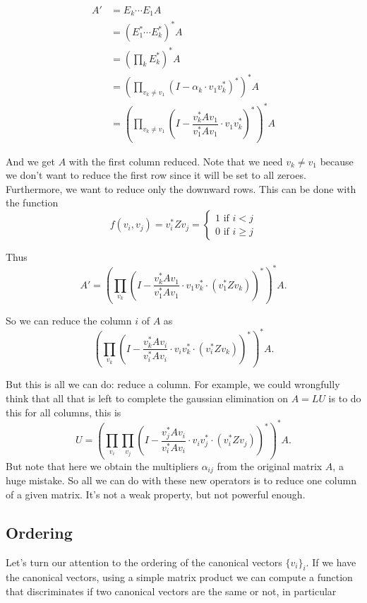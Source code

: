 \begin{align*}
A'&=E_k\cdots E_1A \\
&=\left( E_1^*\cdots E_k^*\right)^*A \\
&=\left(\prod_{k}E_k^*\right)^*A \\
&=\left(\prod_{v_k\neq v_1}\left(I-\alpha_k\cdot v_1v_k^*\right)^*\right)^*A \\
&=\left(\prod_{v_k\neq v_1}\left(I-\dfrac{v_k^*Av_1}{v_1^*Av_1}\cdot v_1v_k^*\right)^*\right)^*A
\end{align*}

And we get $A$ with the first column reduced. Note that we need $v_k\neq v_1$ because we don't want to reduce the first row since it will be set to all zeroes. Furthermore, we want to reduce only the downward rows. This can be done with the function 
\[
  			f(v_i, v_j)=v_i^*Zv_j=\begin{cases}
               1 \text{ if } i < j \\
               0 \text{ if } i \geq j
            \end{cases}
		\]

Thus $$A'=\left(\prod_{v_k}\left(I-\dfrac{v_k^*Av_1}{v_1^*Av_1}\cdot v_1v_k^*\cdot\left(v_1^*Zv_k\right)\right)^*\right)^*A.$$

So we can reduce the column $i$ of $A$ as $$\left(\prod_{v_k}\left(I-\dfrac{v_k^*Av_i}{v_i^*Av_i}\cdot v_iv_k^*\cdot\left(v_i^*Zv_k\right)\right)^*\right)^*A.$$

But this is all we can do: reduce a column. For example, we could wrongfully think that all that is left to complete the gaussian elimination on $A=LU$ is to do this for all columns, this is $$U=\left(\prod_{v_i}\prod_{v_j}\left(I-\dfrac{v_j^*Av_i}{v_i^*Av_i}\cdot v_iv_j^*\cdot\left(v_i^*Zv_j\right)\right)^*\right)^*A.$$
But note that here we obtain the multipliers $\alpha_{ij}$ from the original matrix $A$, a huge mistake. So all we can do with these new operators is to reduce one column of a given matrix. It's not a weak property, but not powerful enough.

\subsection*{Ordering}

Let's turn our attention to the ordering of the canonical vectors $\lbrace v_i\rbrace_i$. If we have the canonical vectors, using a simple matrix product we can compute a function that discriminates if two canonical vectors are the same or not, in particular


